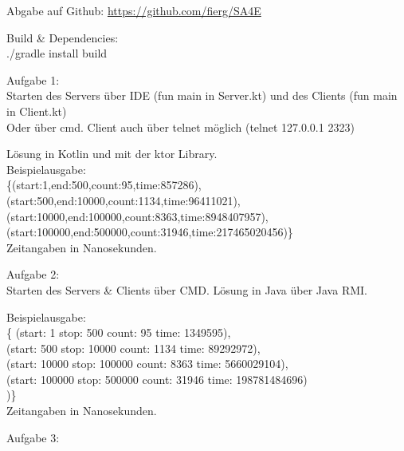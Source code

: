 \documentclass[10pt,a4paper]{article}
\begin{document}
	
\begin{boxedminipage}[t][17cm][t]{\textwidth}
	\par{
	Abgabe auf Github:
	\url{https://github.com/fierg/SA4E}
	
	\medskip
	
	Build \& Dependencies:\\
	./gradle install build\\
}

	\par{

	
	Aufgabe 1:\\
	Starten des Servers über IDE (fun main in Server.kt) und des Clients (fun main in Client.kt)\\
	Oder über cmd.
	Client auch über telnet möglich (telnet 127.0.0.1 2323)
	
	
	Lösung in Kotlin und mit der ktor Library.\\
	Beispielausgabe:\\
	\{(start:1,end:500,count:95,time:857286),\\
	(start:500,end:10000,count:1134,time:96411021),\\
	(start:10000,end:100000,count:8363,time:8948407957),\\
	(start:100000,end:500000,count:31946,time:217465020456)\}\\

	Zeitangaben in Nanosekunden.\\
}


	\par{
		Aufgabe 2:\\
		Starten des Servers & Clients über CMD.
		Lösung in Java über Java RMI.
		
		Beispielausgabe:\\
	\{ (start: 1 stop: 500 count: 95 time: 1349595),\\
(start: 500 stop: 10000 count: 1134 time: 89292972),\\
(start: 10000 stop: 100000 count: 8363 time: 5660029104),\\
(start: 100000 stop: 500000 count: 31946 time: 198781484696)\\
)\}\\
	
	Zeitangaben in Nanosekunden.\\
		
	}
	
	
	\par{
	Aufgabe 3:\\
	
}
	
\end{boxedminipage}	
\end{document}
